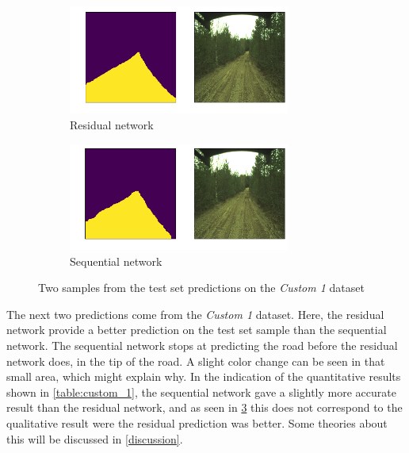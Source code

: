 \documentclass[USenglish]{ifimaster}  %
\begin{document}
\begin{figure}[ht]
\centering
\begin{subfigure}[b]{\textwidth}
\centering
\includegraphics[width=0.8\textwidth]{bilder/custom_1/185_residual.png}
\caption{Residual network}
\label{fig:custom_1_res}
\end{subfigure}
\hfill
\begin{subfigure}[b]{\textwidth}
\centering
\includegraphics[width=0.8\textwidth]{bilder/custom_1/185_sequential.png}
\caption{Sequential network}
\label{fig:custom_1_seq}
\end{subfigure}
\caption{Two samples from the test set predictions on the
\textit{Custom 1} dataset}
\label{fig:custom_1_result}
\end{figure}

The next two predictions come from the \textit{Custom 1} dataset. Here, the residual network provide a better prediction on the test set sample than the sequential network. The sequential network stops at predicting the road before the residual network does, in the tip of the road. A slight color change can be seen in that small area, which might explain why. In the indication of the quantitative results shown in \cref{table:custom_1}, the sequential network gave a slightly more accurate result than the residual network, and as seen in \cref{fig:custom_1_result} this does not correspond to the qualitative result were the residual prediction was better. Some theories about this will be discussed in \cref{discussion}. 
\end{document}
